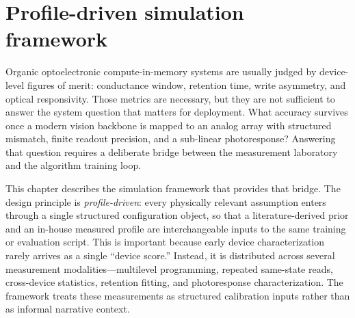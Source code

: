 %
%

\chapter{Profile-driven simulation framework}
\label{chap:framework}

Organic optoelectronic compute-in-memory systems are usually judged by device-level figures of merit: conductance window, retention time, write asymmetry, and optical responsivity. Those metrics are necessary, but they are not sufficient to answer the system question that matters for deployment. What accuracy survives once a modern vision backbone is mapped to an analog array with structured mismatch, finite readout precision, and a sub-linear photoresponse? Answering that question requires a deliberate bridge between the measurement laboratory and the algorithm training loop.

This chapter describes the simulation framework that provides that bridge. The design principle is \emph{profile-driven}: every physically relevant assumption enters through a single structured configuration object, so that a literature-derived prior and an in-house measured profile are interchangeable inputs to the same training or evaluation script. This is important because early device characterization rarely arrives as a single ``device score.'' Instead, it is distributed across several measurement modalities---multilevel programming, repeated same-state reads, cross-device statistics, retention fitting, and photoresponse characterization. The framework treats these measurements as structured calibration inputs rather than as informal narrative context.

